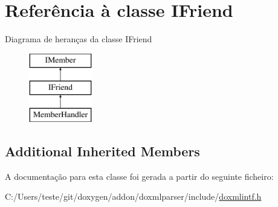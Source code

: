 \hypertarget{class_i_friend}{\section{Referência à classe I\-Friend}
\label{class_i_friend}
}
Diagrama de heranças da classe I\-Friend\begin{figure}[H]
\begin{center}
\leavevmode
\includegraphics[height=3.000000cm]{class_i_friend}
\end{center}
\end{figure}
\subsection*{Additional Inherited Members}


A documentação para esta classe foi gerada a partir do seguinte ficheiro\-:\begin{DoxyCompactItemize}
\item 
C\-:/\-Users/teste/git/doxygen/addon/doxmlparser/include/\hyperlink{include_2doxmlintf_8h}{doxmlintf.\-h}\end{DoxyCompactItemize}
